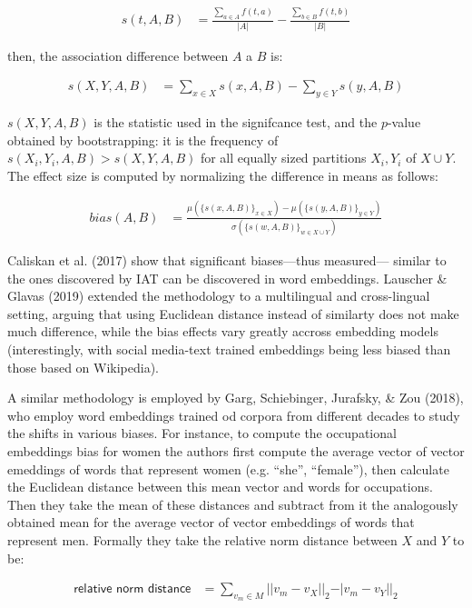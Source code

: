 \documentclass[10pt,dvipsnames,enabledeprecatedfontcommands]{scrartcl}
\begin{document}
\begin{align}
s(t,A,B) & = \frac{\sum_{a\in A}f(t,a)}{\vert A\vert} - \frac{\sum_{b\in B}f(t,b)}{\vert B\vert}
\end{align}

\noindent then, the association difference between \(A\) a \(B\) is:

\begin{align}
s(X,Y,A,B) & = \sum_{x\in X} s(x,A,B) -  \sum_{y\in Y} s(y,A,B)
\end{align}

\noindent
\(s(X,Y,A,B)\) is the statistic used in the signifcance test, and the
\(p\)-value obtained by bootstrapping: it is the frequency of
\(s(X_i,Y_i,A,B)>s(X,Y,A,B)\) for all equally sized partitions
\(X_i, Y_i\) of \(X\cup Y\). The effect size is computed by normalizing
the difference in means as follows:

\begin{align}
bias(A,B) & = \frac{
\mu(\{s(x,A,B)\}_{x\in X}) -\mu(\{s(y,A,B)\}_{y\in Y}) 
}{
\sigma(\{s(w,A,B)\}_{w\in X\cup Y})
}
\end{align}

Caliskan et al. (2017) show that significant biases---thus measured---
similar to the ones discovered by IAT can be discovered in word
embeddings. Lauscher \& Glavas (2019) extended the methodology to a
multilingual and cross-lingual setting, arguing that using Euclidean
distance instead of similarty does not make much difference, while the
bias effects vary greatly accross embedding models (interestingly, with
social media-text trained embeddings being less biased than those based
on Wikipedia).

A similar methodology is employed by Garg, Schiebinger, Jurafsky, \& Zou
(2018), who employ word embeddings trained od corpora from different
decades to study the shifts in various biases. For instance, to compute
the occupational embeddings bias for women the authors first compute the
average vector of vector emeddings of words that represent women (e.g.
``she'', ``female''), then calculate the Euclidean distance between this
mean vector and words for occupations. Then they take the mean of these
distances and subtract from it the analogously obtained mean for the
average vector of vector embeddings of words that represent men.
Formally they take the relative norm distance between \(X\) and \(Y\) to
be:

\begin{align}
\textsf{relative norm distance} & = \sum_{v_m\in M} \vert \vert v_m - v_X\vert \vert_2 - \vert v_m - v_Y\vert \vert_2
\end{align}
\end{document}
